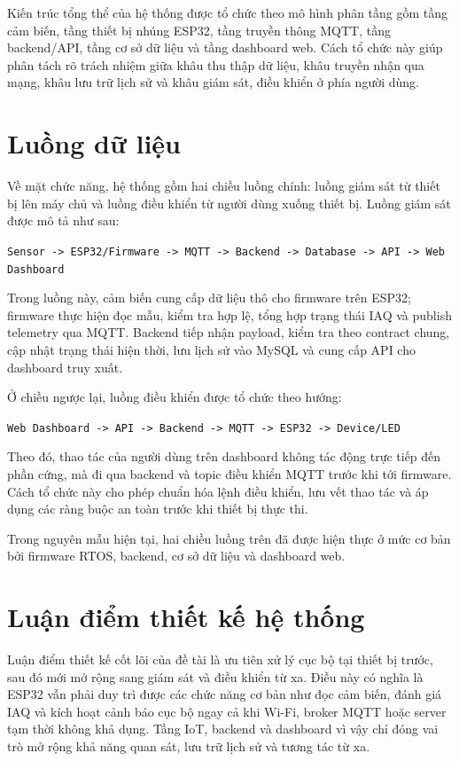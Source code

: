 Kiến trúc tổng thể của hệ thống được tổ chức theo mô hình phân tầng gồm tầng cảm biến,
tầng thiết bị nhúng ESP32, tầng truyền thông MQTT, tầng backend/API, tầng cơ sở dữ liệu
và tầng dashboard web. Cách tổ chức này giúp phân tách rõ trách nhiệm giữa khâu thu
thập dữ liệu, khâu truyền nhận qua mạng, khâu lưu trữ lịch sử và khâu giám sát, điều
khiển ở phía người dùng.

\section{Luồng dữ liệu}

Về mặt chức năng, hệ thống gồm hai chiều luồng chính: luồng giám sát từ thiết bị lên máy
chủ và luồng điều khiển từ người dùng xuống thiết bị. Luồng giám sát được mô tả như sau:

\begin{center}
\texttt{Sensor -> ESP32/Firmware -> MQTT -> Backend -> Database -> API -> Web Dashboard}
\end{center}

Trong luồng này, cảm biến cung cấp dữ liệu thô cho firmware trên ESP32; firmware thực
hiện đọc mẫu, kiểm tra hợp lệ, tổng hợp trạng thái IAQ và publish telemetry qua MQTT.
Backend tiếp nhận payload, kiểm tra theo contract chung, cập nhật trạng thái hiện thời,
lưu lịch sử vào MySQL và cung cấp API cho dashboard truy xuất.

Ở chiều ngược lại, luồng điều khiển được tổ chức theo hướng:

\begin{center}
\texttt{Web Dashboard -> API -> Backend -> MQTT -> ESP32 -> Device/LED}
\end{center}

Theo đó, thao tác của người dùng trên dashboard không tác động trực tiếp đến phần cứng,
mà đi qua backend và topic điều khiển MQTT trước khi tới firmware. Cách tổ chức này cho
phép chuẩn hóa lệnh điều khiển, lưu vết thao tác và áp dụng các ràng buộc an toàn trước
khi thiết bị thực thi.

Trong nguyên mẫu hiện tại, hai chiều luồng trên đã được hiện thực ở mức cơ bản bởi
firmware RTOS, backend, cơ sở dữ liệu và dashboard web.

\section{Luận điểm thiết kế hệ thống}

Luận điểm thiết kế cốt lõi của đề tài là ưu tiên xử lý cục bộ tại thiết bị trước, sau
đó mới mở rộng sang giám sát và điều khiển từ xa. Điều này có nghĩa là ESP32 vẫn phải
duy trì được các chức năng cơ bản như đọc cảm biến, đánh giá IAQ và kích hoạt cảnh báo
cục bộ ngay cả khi Wi-Fi, broker MQTT hoặc server tạm thời không khả dụng. Tầng IoT,
backend và dashboard vì vậy chỉ đóng vai trò mở rộng khả năng quan sát, lưu trữ lịch sử
và tương tác từ xa.

